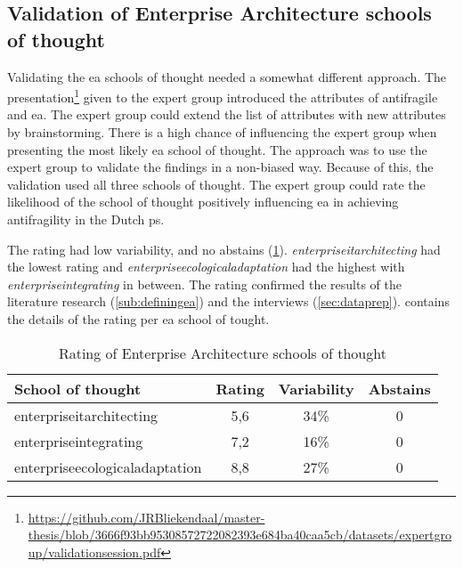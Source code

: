 \subsection{Validation of Enterprise Architecture schools of thought}
\label{sub:validationofeaschools}
Validating the \acrlong{ea} schools of thought needed a somewhat different approach. The presentation\footnote{\url{https://github.com/JRBliekendaal/master-thesis/blob/3666f93bb95308572722082393e684ba40caa5cb/datasets/expertgroup/validationsession.pdf}} given to the expert group introduced the \glspl{attribute} of \gls{antifragile} and \acrshort{ea}. The expert group could extend the list of \glspl{attribute} with new \glspl{attribute} by brainstorming. There is a high chance of influencing the expert group when presenting the most likely \acrlong{ea} school of thought. The approach was to use the expert group to validate the findings in a non-biased way. Because of this, the validation used all three schools of thought. The expert group could rate the likelihood of the school of thought positively influencing \acrlong{ea} in achieving \gls{antifragility} in the Dutch \gls{ps}. 

The rating had low variability, and no abstains (\cref{tab:validationgscoreeaschools}). \textit{\gls{enterpriseitarchitecting}} had the lowest rating and \textit{\gls{enterpriseecologicaladaptation}} had the highest with \textit{\gls{enterpriseintegrating}} in between. The rating confirmed the results of the literature research (\cref{sub:definingea}) and the interviews (\cref{sec:dataprep}).  contains the details of the rating per \acrlong{ea} school of tought.
\begin{table}[H]
	\centering
	\begin{tabular}{p{}ccc}
		\toprule
		\textbf{School of thought} & \textbf{Rating} & \textbf{Variability} & \textbf{Abstains} \\
		\midrule%
		\Gls{enterpriseitarchitecting} & 5,6   & 34\%  & 0 \\
		\Gls{enterpriseintegrating} & 7,2   & 16\%  & 0 \\
		\Gls{enterpriseecologicaladaptation} & 8,8   & 27\%  & 0 \\
		\bottomrule%
	\end{tabular}%
	\caption[Rating of Enterprise Architecture schools of thought]{Rating of Enterprise Architecture schools of thought}
	\label{tab:validationgscoreeaschools}
\end{table}%
